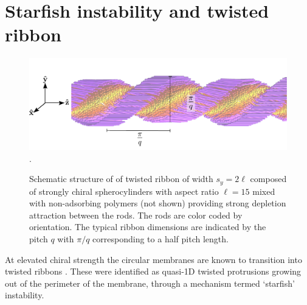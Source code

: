 \section{Starfish instability and twisted ribbon}


\begin{figure}
\begin{center}
\includegraphics[width= \columnwidth]{figures/chapter-5/ribbon_sketch}.
\caption{ \label{ribsnap} Schematic structure of of twisted ribbon of width $s_y=2\ell$ composed of strongly chiral spherocylinders with aspect ratio $\ell = 15$ mixed with non-adsorbing polymers (not shown) providing strong depletion attraction between the rods. The rods are color coded by orientation. The typical  ribbon dimensions are indicated by the pitch $q$ with $\pi/q$ corresponding to a half pitch length.  }
\end{center}
\end{figure}

At elevated chiral strength the circular membranes are known to transition into twisted ribbons \cite{Gibaud2012}. These were identified as quasi-1D twisted protrusions growing out of the perimeter of the membrane, through a mechanism termed `starfish' instability.


